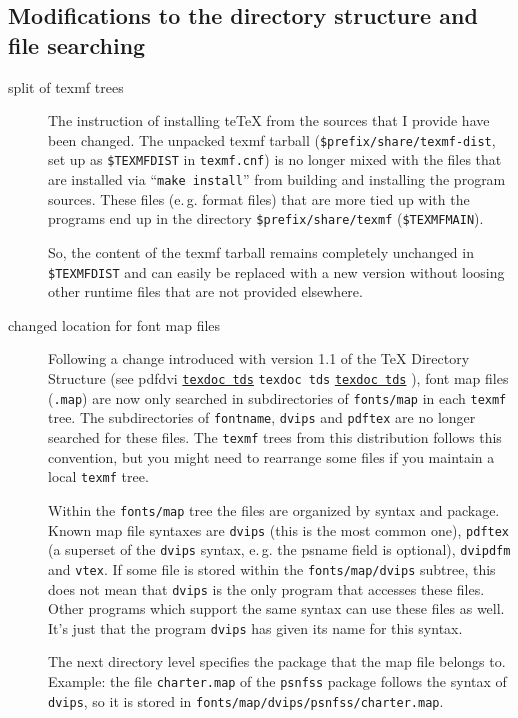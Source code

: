 \documentclass[11pt,a4paper]{article}
\newcommand{\pdfext}{pdf}
\newcommand{\dviext}{dvi}
\newcommand{\dlink}[3]{%
  \ifpdf
    \ifx\pdfext#3
      \href{#1/#2.#3}{\texttt{texdoc #2}}%
    \else
      \texttt{texdoc #2}%
    \fi
  \else
     \href{#1/#2.#3}{\mbox{\texttt{texdoc #2}}}%
  \fi}
\begin{document}
\subsection{Modifications to the directory structure and file searching}
\begin{description}

\item [split of texmf trees] The instruction of installing te\TeX{}
  from the sources that I provide have been changed. The unpacked
  texmf tarball (\verb+$prefix/share/texmf-dist+, %
  set up as \verb+$TEXMFDIST+ %
  in \verb+texmf.cnf+) is no longer mixed with the files that are
  installed via ``\verb+make install+'' from building and installing
  the program sources. These files (e.\,g. format files) that are more
  tied up with the programs end up in the directory
  \verb+$prefix/share/texmf+ (\verb+$TEXMFMAIN+).
  
  So, the content of the texmf tarball remains completely unchanged
  in \verb+$TEXMFDIST+ %
  and can easily be replaced with a new version without loosing other
  runtime files that are not provided elsewhere.

\item [changed location for font map files] Following a change
  introduced with version 1.1 of the \TeX{} Directory Structure (see
  \dlink{../../../texmf-dist/doc/help}{tds}{\dviext}), font map files
  (\verb+.map+) are now only searched in subdirectories of
  \verb+fonts/map+ in each \verb+texmf+ tree. The subdirectories of
  \verb+fontname+, \verb+dvips+ and \verb+pdftex+ are no longer
  searched for these files. The \verb+texmf+ trees from this
  distribution follows this convention, but you might need to
  rearrange some files if you maintain a local \verb+texmf+ tree.
  
  Within the \verb+fonts/map+ tree the files are organized by syntax
  and package. Known map file syntaxes are \verb+dvips+ (this is the
  most common one), \verb+pdftex+ (a superset of the \verb+dvips+
  syntax, e.\,g. the psname field is optional), \verb+dvipdfm+ and
  \verb+vtex+. If some file is stored within the
  \verb+fonts/map/dvips+ subtree, this does not mean that \verb+dvips+
  is the only program that accesses these files. Other programs which
  support the same syntax can use these files as well. It's just that
  the program \verb+dvips+ has given its name for this syntax.
  
  The next directory level specifies the package that the map file
  belongs to.  Example: the file \verb+charter.map+ of the
  \verb+psnfss+ package follows the syntax of \verb+dvips+, so it is
  stored in \verb+fonts/map/dvips/psnfss/charter.map+.
  

\end{description}
\end{document}
